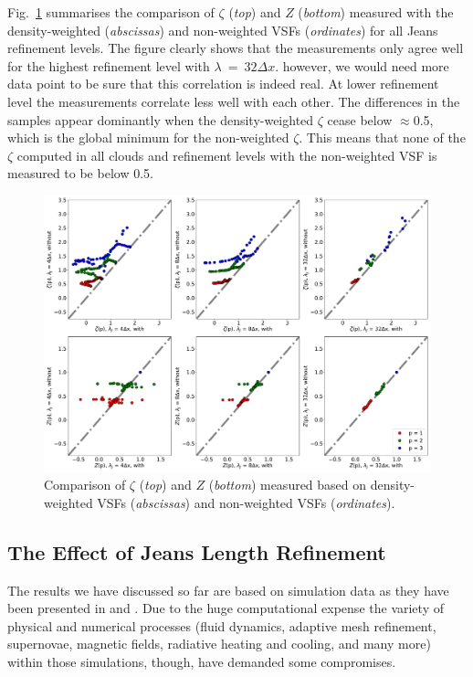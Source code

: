 Fig.~\ref{pic:results:comp_weighting} summarises the comparison of $\zeta$ (\textit{top}) and $Z$ (\textit{bottom}) measured with the density-weighted (\textit{abscissas}) and non-weighted VSFs (\textit{ordinates}) for all Jeans refinement levels.
The figure clearly shows that the measurements only agree well for the highest refinement level with $\lambda~=~32\Delta x$.
however, we would need more data point to be sure that this correlation is indeed real.
At lower refinement level the measurements correlate less well with each other. 
The differences in the samples appear dominantly when the density-weighted $\zeta$ cease below $\approx$0.5, which is the global minimum for the non-weighted $\zeta$. 
This means that none of the $\zeta$ computed in all clouds and refinement levels with the non-weighted VSF is measured to be below 0.5. 

\begin{figure}
	\centering
    \includegraphics[width=\textwidth]{comp_weighting.pdf}
    \caption{ Comparison of $\zeta$ (\textit{top}) and $Z$ (\textit{bottom}) measured based on density-weighted VSFs (\textit{abscissas}) and non-weighted VSFs (\textit{ordinates}). }
    \label{pic:results:comp_weighting}
\end{figure}




\subsection{The Effect of Jeans Length Refinement}\label{results:refinement}

The results we have discussed so far are based on simulation data as they have been presented in  and .
Due to the huge computational expense the variety of physical and numerical processes (fluid dynamics, adaptive mesh refinement, supernovae, magnetic fields, radiative heating and cooling, and many more) within those simulations, though, have demanded some compromises.

